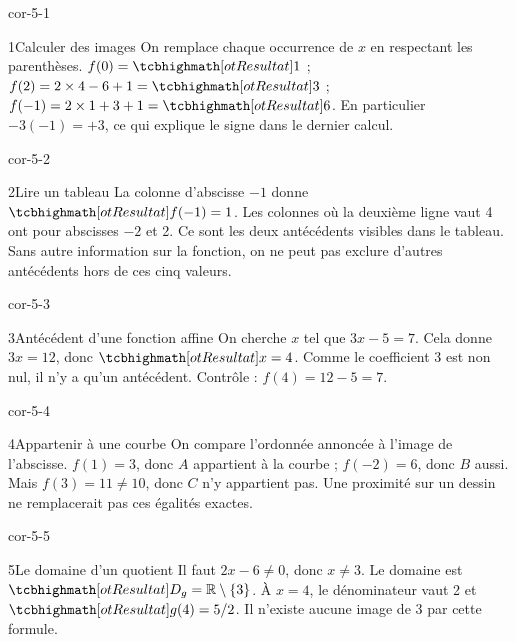 \clearpage\pagestyle{otMain}\fontsize{11}{15}\selectfont
{}
\begin{blocLivre}{cor-5-1}
\begin{corrige}{1}{Calculer des images}
On remplace chaque occurrence de $x$ en respectant les parenthèses. $f(0)=\res1$ ; $f(2)=2\times4-6+1=\res3$ ; $f(-1)=2\times1+3+1=\res6$. En particulier $-3(-1)=+3$, ce qui explique le signe dans le dernier calcul.
\end{corrige}
\end{blocLivre}
\begin{blocLivre}{cor-5-2}
\begin{corrige}{2}{Lire un tableau}
La colonne d’abscisse $-1$ donne $\res{f(-1)=1}$. Les colonnes où la deuxième ligne vaut 4 ont pour abscisses $-2$ et 2. Ce sont les deux antécédents visibles dans le tableau. Sans autre information sur la fonction, on ne peut pas exclure d’autres antécédents hors de ces cinq valeurs.
\end{corrige}
\end{blocLivre}
\begin{blocLivre}{cor-5-3}
\begin{corrige}{3}{Antécédent d’une fonction affine}
On cherche $x$ tel que $3x-5=7$. Cela donne $3x=12$, donc $\res{x=4}$. Comme le coefficient 3 est non nul, il n’y a qu’un antécédent. Contrôle : $f(4)=12-5=7$.
\end{corrige}
\end{blocLivre}
\begin{blocLivre}{cor-5-4}
\begin{corrige}{4}{Appartenir à une courbe}
On compare l’ordonnée annoncée à l’image de l’abscisse. $f(1)=3$, donc $A$ appartient à la courbe ; $f(-2)=6$, donc $B$ aussi. Mais $f(3)=11\ne10$, donc $C$ n’y appartient pas. Une proximité sur un dessin ne remplacerait pas ces égalités exactes.
\label{fig-cor-5-4}
\end{corrige}
\end{blocLivre}
\begin{blocLivre}{cor-5-5}
\begin{corrige}{5}{Le domaine d’un quotient}
Il faut $2x-6\ne0$, donc $x\ne3$. Le domaine est $\res{D_g=\mathbb R\setminus\{3\}}$. À $x=4$, le dénominateur vaut 2 et $\res{g(4)=5/2}$. Il n’existe aucune image de 3 par cette formule.
\end{corrige}
\end{blocLivre}
